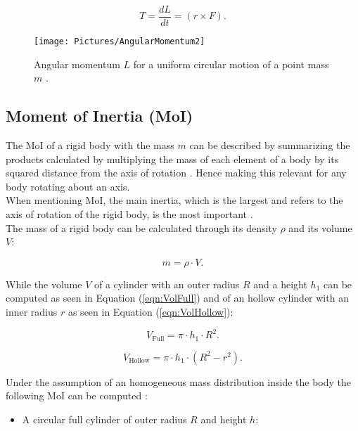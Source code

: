 \begin{equation}
T = \frac{dL}{dt} = (r \times F) .
\label{eqn:torque}
\end{equation} 

\begin{figure}[H]
{\centering
\texttt{[image: Pictures/AngularMomentum2]}
\caption{Angular momentum $L$ for a uniform circular motion of a point mass $m$ \cite{Demtroder.2017}.}
\label{fig:AngularMomentum2}
}
\end{figure}



\subsection{Moment of Inertia (MoI)}
\label{sec:Inertia}
The MoI of a rigid body with the mass $m$ can be described by summarizing the products calculated by multiplying the mass of each element of a body by its squared distance from the axis of rotation \cite{.2003}. Hence making this relevant for any body rotating about an axis.\\
When mentioning MoI, the main inertia, which is the largest and refers to the axis of rotation of the rigid body, is the most important \cite{Messerschmid.2017}\cite{Demtroder.2017}.\\
The mass of a rigid body can be calculated through its density $\rho$ and its volume $V$:

\begin{equation}
m = \rho \cdot V .
\label{eqn:mass}
\end{equation}

While the volume $V$ of a cylinder with an outer radius $R$ and a height $h_\text{1}$ can be computed as seen in Equation (\ref{eqn:VolFull}) and of an hollow cylinder with an inner radius $r$ as seen in Equation (\ref{eqn:VolHollow}):

\begin{equation}
V_\text{Full} = \pi \cdot h_\text{1} \cdot R^{2} .
\label{eqn:VolFull}
\end{equation}

\begin{equation}
V_\text{Hollow} = \pi \cdot h_\text{1} \cdot (R^{2}-r^{2}) .
\label{eqn:VolHollow}
\end{equation}

Under the assumption of an homogeneous mass distribution inside the body the following MoI can be computed \cite{Spiegel.2013}:

\begin{itemize}
  \setlength{\itemsep}{2pt}
\item A circular full cylinder of outer radius $R$ and height $h$:
\end{itemize}

